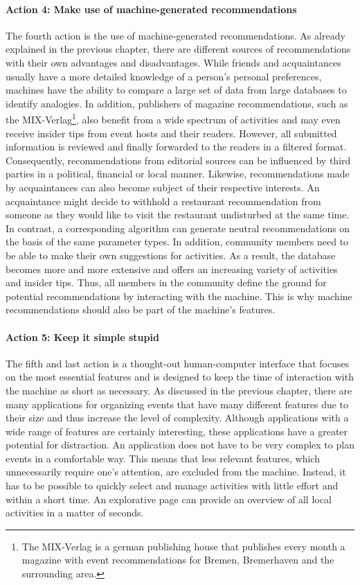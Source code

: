 \documentclass[12pt,numbers=noenddot,parskip,bibliography=totocnumbered,listof=totocnumbered]{scrreprt}
\begin{document}
\paragraph{Action 4: Make use of machine-generated recommendations}
The fourth action is the use of machine-generated recommendations. As already explained in the previous chapter, there are different sources of recommendations with their own advantages and disadvantages. While friends and acquaintances usually have a more detailed knowledge of a person's personal preferences, machines have the ability to compare a large set of data from large databases to identify analogies. In addition, publishers of magazine recommendations, such as the MIX-Verlag\footnote{The MIX-Verlag is a german publishing house that publishes every month a magazine with event recommendations for Bremen, Bremerhaven and the surrounding area.}, also benefit from a wide spectrum of activities and may even receive insider tips from event hosts and their readers. However, all submitted information is reviewed and finally forwarded to the readers in a filtered format. Consequently, recommendations from editorial sources can be influenced by third parties in a political, financial or local manner. Likewise, recommendations made by acquaintances can also become subject of their respective interests. An acquaintance might decide to withhold a restaurant recommendation from someone as they would like to visit the restaurant undisturbed at the same time.\newline
In contrast, a corresponding algorithm can generate neutral recommendations on the basis of the same parameter types. In addition, community members need to be able to make their own suggestions for activities. As a result, the database becomes more and more extensive and offers an increasing variety of activities and insider tips. Thus, all members in the community define the ground for potential recommendations by interacting with the machine. This is why machine recommendations should also be part of the machine's features.

\paragraph{Action 5: Keep it simple stupid}
The fifth and last action is a thought-out human-computer interface that focuses on the most essential features and is designed to keep the time of interaction with the machine as short as necessary. As discussed in the previous chapter, there are many applications for organizing events that have many different features due to their size and thus increase the level of complexity. Although applications with a wide range of features are certainly interesting, these applications have a greater potential for distraction. An application does not have to be very complex to plan events in a comfortable way. \newline
This means that less relevant features, which unnecessarily require one's attention, are excluded from the machine. Instead, it has to be possible to quickly select and manage activities with little effort and within a short time. An explorative page can provide an overview of all local activities in a matter of seconds.
\end{document}
